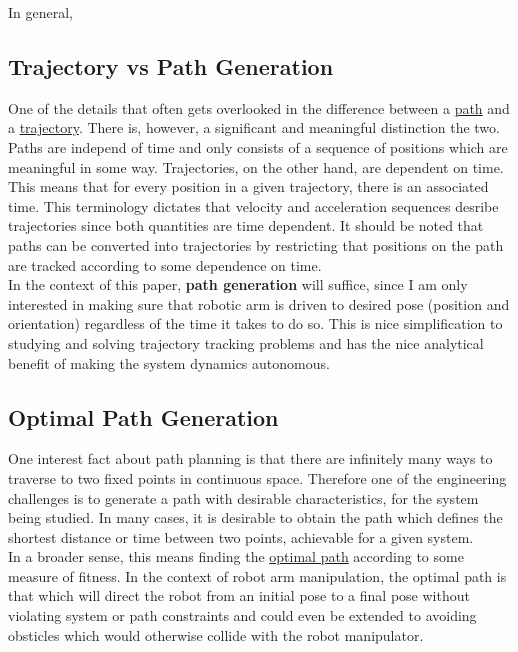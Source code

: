 \documentclass[journal]{IEEEtran}
\begin{document}
In general,
\subsection{Trajectory vs Path Generation}

One of the details that often gets overlooked in the difference between a \underline{path} and a \underline{trajectory}. There is, however, a significant and meaningful distinction the two. Paths are independ of time and only consists of a sequence of positions which are meaningful in some way. Trajectories, on the other hand, are dependent on time. This means that for every position in a given trajectory, there is an associated time. This terminology dictates that velocity and acceleration sequences desribe trajectories since both quantities are time dependent. It should be noted that paths can be converted into trajectories by restricting that positions on the path are tracked according to some dependence on time. \\

In the context of this paper, \textbf{path generation} will suffice, since I am only interested in making sure that robotic arm is driven to desired pose (position and orientation) regardless of the time it takes to do so. This is nice simplification to studying and solving trajectory tracking problems and has the nice analytical benefit of making the system dynamics autonomous.

\subsection{Optimal Path Generation}

One interest fact about path planning is that there are infinitely many ways to traverse to two fixed points in continuous space. Therefore one of the engineering challenges is to generate a path with desirable characteristics, for the system being studied. In many cases, it is desirable to obtain the path which defines the shortest distance or time between two points, achievable for a given system. \\

In a broader sense, this means finding the \underline{optimal path} according to some measure of fitness. In the context of robot arm manipulation, the optimal path is that which will direct the robot from an initial pose to a final pose without violating system or path constraints and could even be extended to avoiding obsticles which would otherwise collide with the robot manipulator. \\
\end{document}
